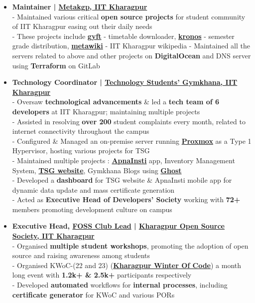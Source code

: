 \documentclass[a4paper,10pt]{extarticle} %
\begin{document}
\begin{itemize}[leftmargin=0.55cm, rightmargin=0.2cm, label={\Large\textbullet}]

\item \textbf{Maintainer | \href{https://metakgp.org/}{Metakgp, IIT Kharagpur}}\\
- Maintained various critical \textbf{open source projects} for student community of IIT Kharagpur easing out their daily needs \\
- These projects include \href{https://github.com/metakgp/gyft}{\textbf{gyft}} - timetable downloader, \href{http://github.com/metakgp/kronos}{\textbf{kronos}} - semester grade distribution, \href{https://github.com/metakgp/metakgp-wiki}{\textbf{metawiki}} - IIT Kharagpur wikipedia \newline
- Maintained all the servers related to above and other projects on \textbf{DigitalOcean} and DNS server using \textbf{Terraform} on GitLab

\item \textbf{Technology Coordinator | \href{https://gymkhana.iitkgp.ac.in/}{Technology Students' Gymkhana, IIT Kharagpur}}\\
- Oversaw \textbf{technological advancements} \& led a \textbf{tech team of 6 developers} at IIT Kharagpur; maintaining multiple projects \\
- Assisted in resolving \textbf{over 200} student complaints every month, related to internet connectivity throughout the campus \\
- Configured \& Managed an on-premise server running \href{https://www.proxmox.com/en/}{\textbf{Proxmox}} as a Type 1 Hypervisor, hosting various projects for TSG \\
- Maintained multiple projects : \href{https://play.google.com/store/apps/details?id=com.apnainsti&pli=1}{\textbf{ApnaInsti}} app, Inventory Management System, \href{https://gymkhana.iitkgp.ac.in/}{\textbf{TSG website}}, Gymkhana Blogs using \href{https://ghost.org/}{\textbf{Ghost}} \\
- Developed a \textbf{dashboard} for TSG website \& ApnaInsti mobile app for dynamic data update and mass certificate generation \\
- Acted as \textbf{Executive Head of Developers' Society} working with \textbf{72+} members promoting development culture on campus

\item \textbf{Executive Head, \href{https://fossunited.org/clubs}{\textbf{FOSS Club Lead}} | \href{https://kossiitkgp.org}{Kharagpur Open Source Society, IIT Kharagpur}}\\
- Organised \textbf{multiple student workshops}, promoting the adoption of open source and raising awareness among students \\
- Organised KWoC-(22 and 23) (\textbf{\href{https://kwoc.kossiitkgp.org/}{Kharagpur Winter Of Code}}) a month long event with \textbf{1.2k+ \& 2.5k+} participants respectively \\
- Developed \textbf{automated} workflows for \textbf{internal processes}, including \textbf{certificate generator} for KWoC and various PORs


\end{itemize}
\end{document}
